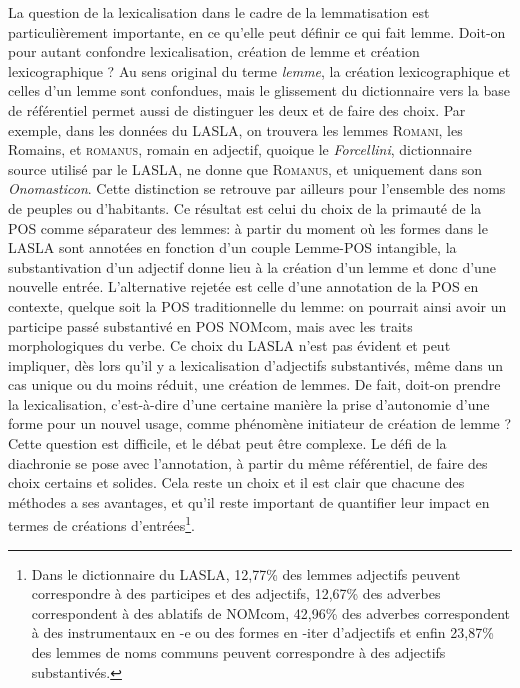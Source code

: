 La question de la lexicalisation dans le cadre de la lemmatisation est particulièrement importante, en ce qu'elle peut définir ce qui fait lemme. Doit-on pour autant confondre lexicalisation, création de lemme et création lexicographique ? Au sens original du terme \textit{lemme}, la création lexicographique et celles d'un lemme sont confondues, mais le glissement du dictionnaire vers la base de référentiel permet aussi de distinguer les deux et de faire des choix. Par exemple, dans les données du LASLA, on trouvera les lemmes \textsc{Romani}, les Romains, et \textsc{romanus}, romain en adjectif, quoique le \textit{Forcellini}, dictionnaire source utilisé par le LASLA, ne donne que \textsc{Romanus}, et uniquement dans son \textit{Onomasticon}. Cette distinction se retrouve par ailleurs pour l'ensemble des noms de peuples ou d'habitants. Ce résultat est celui du choix de la primauté de la POS comme séparateur des lemmes: à partir du moment où les formes dans le LASLA sont annotées en fonction d'un couple Lemme-POS intangible, la substantivation d'un adjectif donne lieu à la création d'un lemme et donc d'une nouvelle entrée. L'alternative rejetée est celle d'une annotation de la POS en contexte, quelque soit la POS traditionnelle du lemme: on pourrait ainsi avoir un participe passé substantivé en POS NOMcom, mais avec les traits morphologiques du verbe. Ce choix du LASLA n'est pas évident et peut impliquer, dès lors qu'il y a lexicalisation d'adjectifs substantivés, même dans un cas unique ou du moins réduit, une création de lemmes. De fait, doit-on prendre la lexicalisation, c'est-à-dire d'une certaine manière la prise d'autonomie d'une forme pour un nouvel usage, comme phénomène initiateur de création de lemme ? Cette question est difficile, et le débat peut être complexe. Le défi de la diachronie se pose avec l'annotation, à partir du même référentiel, de faire des choix certains et solides. Cela reste un choix et il est clair que chacune des méthodes a ses avantages, et qu'il reste important de quantifier leur impact en termes de créations d'entrées\footnote{Dans le dictionnaire du LASLA, 12,77\% des lemmes adjectifs peuvent correspondre à des participes et des adjectifs, 12,67\% des adverbes correspondent à des ablatifs de NOMcom, 42,96\% des adverbes correspondent à des instrumentaux en -e ou des formes en -iter d'adjectifs et enfin 23,87\% des lemmes de noms communs peuvent correspondre à des adjectifs substantivés.}.

